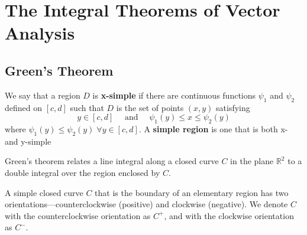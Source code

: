 \documentclass[12pt]{book}
\theoremstyle{definition}
\theoremstyle{remark}
\begin{document}
 \chapter{The Integral Theorems of Vector Analysis}
 \section{Green's Theorem}
\begin{note} 
  We say that a region $D$ is \textbf{x-simple} if there are continuous functions $\psi_1$ and $\psi_2$ defined on $[c, d]$ such that $D$ is the set of points $(x, y)$ satisfying
  $$y \in [c,d] \quad \text{ and } \quad \psi_1 (y) \leq x \leq \psi_2 (y) $$
  where $\psi_1(y) \leq \psi_2 (y) \; \forall y \in[c,d]$. A \textbf{simple region} is one that is both x- and y-simple
\end{note}
Green’s theorem relates a line integral along a closed curve $C$ in the plane $\mathbb{R}^2$ to a double integral over the region enclosed by $C$.


A simple closed curve $C$ that is the boundary of an elementary region has two orientations—counterclockwise (positive) and clockwise (negative). We denote $C$ with the counterclockwise orientation as $C^+$, and with the clockwise orientation as $C^-$. 
\end{document}
